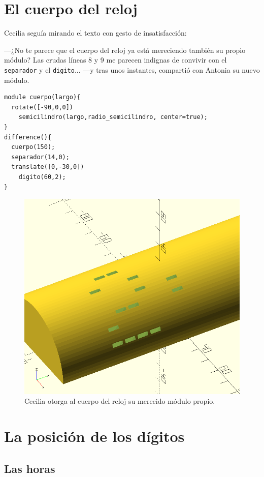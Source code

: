 \section{El cuerpo del reloj}

Cecilia seguía mirando el texto con gesto de in\-sa\-tis\-fac\-ción:

---¿No te parece que el cuerpo del reloj ya está mereciendo también su
propio módulo?  Las crudas líneas 8 y 9 me parecen indignas de
convivir con el \lstinline!separador! y el \lstinline!digito!...  ---y
tras unos instantes, compartió con Antonia su nuevo módulo.

    \begin{lstlisting}
module cuerpo(largo){
  rotate([-90,0,0])
    semicilindro(largo,radio_semicilindro, center=true);  
}
difference(){
  cuerpo(150);
  separador(14,0);
  translate([0,-30,0])
    digito(60,2);
}
    \end{lstlisting}%

    \begin{figure}[ht]
      \centering
       \includegraphics[width=.44\textwidth]{imagenes/separador}
       \caption{Cecilia otorga al cuerpo del reloj su merecido módulo
         propio.}
  \label{fig:separador-3}
\end{figure}


\section{La posición de los dígitos}

\subsection{Las horas}

